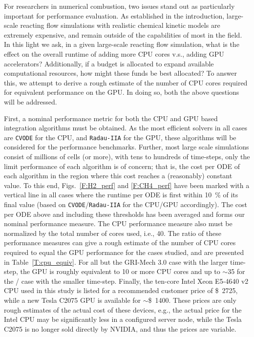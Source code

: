 \documentclass[final,twocolumn]{elsarticle}
\begin{document}
For researchers in numerical combustion, two issues stand out as particularly important for performance evaluation.
As established in the introduction, large-scale reacting flow simulations with realistic chemical kinetic models are extremely expensive, and remain outside of the capabilities of most in the field.
In this light we ask, in a given large-scale reacting flow simulation, what is the effect on the overall runtime of adding more CPU cores v.s., adding GPU accelerators?
Additionally, if a budget is allocated to expand available computational resources, how might these funds be best allocated?
To answer this, we attempt to derive a rough estimate of the number of CPU cores required for equivalent performance on the GPU.
In doing so, both the above questions will be addressed.

First, a nominal performance metric for both the CPU and GPU based integration algorithms must be obtained.
As the most efficient solvers in all cases are \texttt{CVODE} for the CPU, and \texttt{Radau-IIA} for the GPU, these algorithms will be considered for the performance benchmarks.
Further, most large scale simulations consist of millions of cells (or more), with tens to hundreds of time-steps, only the limit performance of each algorithm is of concern; that is, the cost per ODE of each algorithm in the region where this cost reaches a (reasonably) constant value.
To this end, Figs.~\ref{F:H2_perf} and \ref{F:CH4_perf} have been marked with a vertical line in all cases where the runtime per ODE is first within \SI{10}{\percent} of its final value (based on \texttt{CVODE}\slash\texttt{Radau-IIA} for the CPU\slash GPU accordingly).
The cost per ODE above and including these thresholds has been averaged and forms our nominal performance measure.
The CPU performance measure also must be normalized by the total number of cores used, i.e., \num{40}.
The ratio of these performance measures can give a rough estimate of the number of CPU cores required to equal the GPU performance for the cases studied, and are presented in Table~\ref{T:cpu_equiv}.
For all but the GRI-Mech 3.0 case with the larger time-step, the GPU is roughly equivalent to \num{10} or more CPU cores and up to $\sim$\num{35} for the \slash{} case with the smaller time-step.
Finally, the ten-core Intel Xeon E5-4640 v2 CPU used in this study is listed for a recommended customer price of \SI{2725}[\$]{}, while a new Tesla C2075 GPU is available for $\sim$\SI{1400}[\$]{}.
These prices are only rough estimates of the actual cost of these devices, e.g., the actual price for the Intel CPU may be significantly less in a configured server node, while the Tesla C2075 is no longer sold directly by NVIDIA, and thus the prices are variable.
\end{document}
